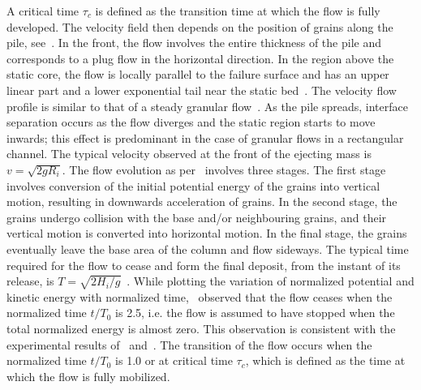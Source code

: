 A critical time $\tau_{\textit{c}}$ is defined as the transition time at which 
the flow is fully developed. The velocity field then depends on the position of 
grains along the pile, see~\citet{Lajeunesse2005}. In the front, the flow 
involves the entire thickness of the pile and corresponds to a plug flow in the 
horizontal direction. In the region above the static core, the flow is locally 
parallel to the failure surface and has an upper linear part and a lower 
exponential tail near the static bed~\citep{Lajeunesse2005}. The velocity flow 
profile is similar to that of a steady granular flow~\citep{Midi2004}. As the 
pile spreads, interface separation occurs as the flow diverges and the static 
region starts to move inwards; this effect is predominant in the case of 
granular flows in a rectangular channel. The typical velocity observed at the 
front of the ejecting mass is 
$\textit{v}=\sqrt{2\textit{g}\textit{R}_{\textit{i}}}$. The flow evolution as 
per~\citet{Staron2005} involves three stages. The first stage involves 
conversion of the initial potential energy of the grains into vertical motion, 
resulting in downwards acceleration of grains. In the second stage, the grains 
undergo collision with the base and/or neighbouring grains, and their vertical 
motion is converted into horizontal motion. In the final stage, the grains 
eventually leave the base area of the column and flow sideways. The typical 
time required for the flow to cease and form the final deposit, from the 
instant of its release, is 
$\textit{T}=\sqrt{2\textit{H}_{\textit{i}}/\textit{g}}$~\citep{Staron2005}. 
While plotting the variation of normalized potential and kinetic energy with 
normalized time,~\citet{Staron2005} observed that the flow ceases when the 
normalized time $\textit{t}/\textit{T}_0$ is 2.5, i.e. the flow is assumed to 
have stopped when the total normalized energy is almost zero. This observation 
is consistent with the experimental results of~\citet{Lube2005} 
and~\citet{Lajeunesse2005}. The transition of the flow occurs when the 
normalized time $\textit{t}/\textit{T}_0$ is 1.0 or at critical time 
$\tau_{\textit{c}}$, which is defined as the time at which the flow is fully 
mobilized.

